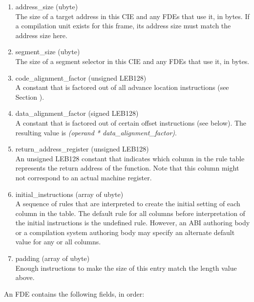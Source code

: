 \begin{enumerate}[1.]
\item  address\_size (ubyte) \\
The size of a target address
in this CIE and any FDEs that
use it, in bytes. If a compilation unit exists for this frame,
its address size must match the address size here.

\item  segment\_size (ubyte) \\
The size of a segment selector in this CIE and any FDEs that
use it, in bytes.

\item  code\_alignment\_factor (unsigned LEB128) \\
A constant that is factored out of all advance location
instructions (see 
Section ).


\item  data\_alignment\_factor (signed LEB128) \\
A constant that is factored out of certain offset instructions
(see below). The resulting value is  \textit{(operand *
data\_alignment\_factor)}.

\item  return\_address\_register (unsigned LEB128) \\
An unsigned LEB128 constant that indicates which column in the
rule table represents the return address of the function. Note
that this column might not correspond to an actual machine
register.

\item initial\_instructions (array of ubyte) \\
A sequence of rules that are interpreted to create the initial
setting of each column in the table.  The default rule for
all columns before interpretation of the initial instructions
is the undefined rule. However, an ABI authoring body or a
compilation system authoring body may specify an alternate
default value for any or all columns.

\item padding (array of ubyte) \\
Enough  instructions to make the size of this entry
match the length value above.
\end{enumerate}

An FDE contains the following fields, in order:

